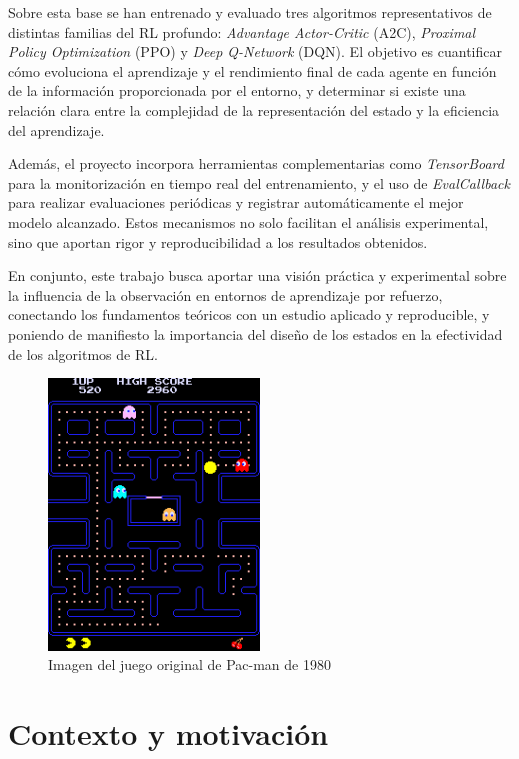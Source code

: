 Sobre esta base se han entrenado y evaluado tres algoritmos representativos de distintas familias del RL profundo: \textit{Advantage Actor-Critic} (A2C), \textit{Proximal Policy Optimization} (PPO) y \textit{Deep Q-Network} (DQN). El objetivo es cuantificar cómo evoluciona el aprendizaje y el rendimiento final de cada agente en función de la información proporcionada por el entorno, y determinar si existe una relación clara entre la complejidad de la representación del estado y la eficiencia del aprendizaje.

Además, el proyecto incorpora herramientas complementarias como \textit{TensorBoard} para la monitorización en tiempo real del entrenamiento, y el uso de \textit{EvalCallback} para realizar evaluaciones periódicas y registrar automáticamente el mejor modelo alcanzado. Estos mecanismos no solo facilitan el análisis experimental, sino que aportan rigor y reproducibilidad a los resultados obtenidos.

En conjunto, este trabajo busca aportar una visión práctica y experimental sobre la influencia de la observación en entornos de aprendizaje por refuerzo, conectando los fundamentos teóricos con un estudio aplicado y reproducible, y poniendo de manifiesto la importancia del diseño de los estados en la efectividad de los algoritmos de RL.

\begin{figure}[h]
\centering
\includegraphics[width=0.5\textwidth]{./figs/image1.png}
\caption{Imagen del juego original de Pac-man de 1980}
\label{fig:screenshot_pacman}
\end{figure}

\section{Contexto y motivación}


